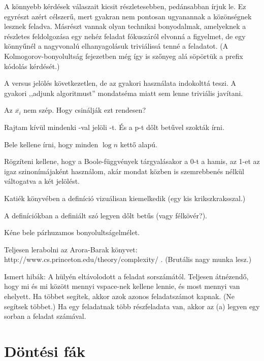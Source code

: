 A könnyebb kérdések válaszait kicsit részletesebben, pedánsabban írjuk le. Ez egyrészt azért célszerű, mert gyakran nem pontosan ugyanannak a közönségnek lesznek feladva. Másrészt vannak olyan technikai bonyodalmak, amelyeknek a részletes feldolgozása egy nehéz feladat fókuszáról elvonná a figyelmet, de egy könnyűnél a nagyvonalú elhanyagolásuk triviálissá tenné a feladatot. (A Kolmogorov-bonyolultság fejezetben még így is szőnyeg alá söpörtük a prefix kódolás kérdését.)

A \LOGSPACE versus \NL jelölés következetlen, de az \Language gyakori használata indokolttá teszi. A gyakori ,,adjunk \LOGSPACE algoritmust'' mondatséma miatt sem lenne triviális javítani.

Az $\overline{x_i}$ nem szép. Hogy csinálják ezt rendesen?

Rajtam kívül mindenki {}-val jelöli \Sigmatwo-t. És a p-t dőlt betűvel szokták írni.

Bele kellene írni, hogy minden $\log n$ kettő alapú.

Rögzíteni kellene, hogy a Boole-függvények tárgyalásakor a 0-t a hamis, az 1-et az igaz szinonímájaként használom, akár mondat közben is szemrebbenés nélkül váltogatva a két jelölést.

Katiék könyvében a definíció vizuálisan kiemelkedik (egy kis krikszkraksszal.)

A definíciókban a definiált szó legyen dőlt betűs (vagy félkövér?).

Kéne bele párhuzamos bonyolultságelmélet.

Teljesen lerabolni az Arora-Barak könyvet: http://www.cs.princeton.edu/theory/complexity/ . (Brutális nagy munka lesz.)

Ismert hibák: A \hard hülyén eltávolodott a feladat sorszámától. Teljesen átnézendő, hogy mi és mi között mennyi vspace-nek kellene lennie, és most mennyi van ehelyett. Ha többet segítek, akkor azok azonos feladatszámot kapnak. (Ne segítsek többet.) Ha egy feladatnak több részfeladata van, akkor az (a) legyen egy sorban a feladat számával.



\chapter{Döntési fák}

